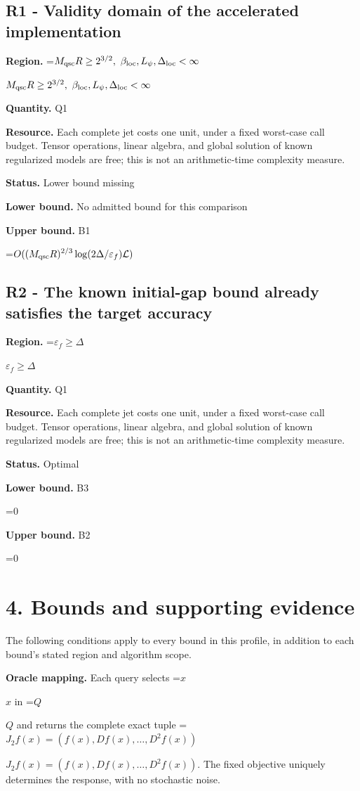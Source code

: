 \documentclass[10pt,a4paper]{article}
\newcommand{\AtlasMath}[1]{\par\begingroup\centering\setbox0=\hbox{$\displaystyle #1$}\ifdim\wd0>1.4\linewidth\typeout{ATLAS WIDE FORMULA: \the\wd0}\fi\ifdim\wd0>\linewidth\resizebox{\linewidth}{!}{\box0}\else\box0\fi\par\endgroup}
\newcommand{\AtlasInlineMath}[1]{\begingroup\setbox0=\hbox{$#1$}\ifdim\wd0>.4\linewidth\endgroup\AtlasMath{#1}\else\endgroup$#1$\fi}
\begin{document}
\subsection{R1 - Validity domain of the accelerated implementation}
\textbf{Region.} \AtlasInlineMath{M_{\rm qsc}R\ge2^{3/2},\ \beta_{\rm loc},L_\psi,\Delta_{\rm loc}<\infty}

\textbf{Quantity.} Q1

\textbf{Resource.} Each complete jet costs one unit, under a fixed worst-case call budget. Tensor operations, linear algebra, and global solution of known regularized models are free; this is not an arithmetic-time complexity measure.

\textbf{Status.} Lower bound missing

\textbf{Lower bound.} No admitted bound for this comparison

\textbf{Upper bound.} B1

\AtlasMath{O((M_{\rm qsc}R)^{2/3}\log(2\Delta/\varepsilon_f)\mathcal{L})}
\subsection{R2 - The known initial-gap bound already satisfies the target accuracy}
\textbf{Region.} \AtlasInlineMath{\varepsilon_f\ge\Delta}

\textbf{Quantity.} Q1

\textbf{Resource.} Each complete jet costs one unit, under a fixed worst-case call budget. Tensor operations, linear algebra, and global solution of known regularized models are free; this is not an arithmetic-time complexity measure.

\textbf{Status.} Optimal

\textbf{Lower bound.} B3

\AtlasMath{0}
\textbf{Upper bound.} B2

\AtlasMath{0}
\section{4. Bounds and supporting evidence}
The following conditions apply to every bound in this profile, in addition to each bound's stated region and algorithm scope.

\textbf{Oracle mapping.} Each query selects \AtlasInlineMath{x} in \AtlasInlineMath{Q} and returns the complete exact tuple \AtlasInlineMath{J_{2}f(x)=(f(x),Df(x),\ldots,D^{2}f(x))}. The fixed objective uniquely determines the response, with no stochastic noise.
\end{document}
